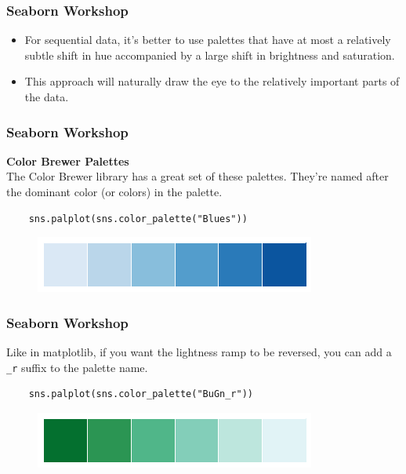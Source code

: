 \documentclass{beamer}
\begin{document}
\begin{frame}[fragile]
	\frametitle{Seaborn Workshop}
	\large
	\begin{itemize}
		\item For sequential data, it’s better to use palettes that have at most a relatively subtle shift in hue accompanied by a large shift in brightness and saturation. 
		\item This approach will naturally draw the eye to the relatively important parts of the data.
	\end{itemize}
\end{frame}
\begin{frame}[fragile]
	\frametitle{Seaborn Workshop}
	\large
	\noindent \textbf{Color Brewer Palettes}\\
	The Color Brewer library has a great set of these palettes. They’re named after the dominant color (or colors) in the palette.
	
	\begin{verbatim}
	sns.palplot(sns.color_palette("Blues"))
	\end{verbatim}
	
	\begin{figure}
		\centering
		\includegraphics[width=0.7\linewidth]{images/color_palettes_25_0}
	\end{figure}
\end{frame}
\begin{frame}[fragile]
	\frametitle{Seaborn Workshop}
	\large
	Like in matplotlib, if you want the lightness ramp to be reversed, you can add a \texttt{\_r} suffix to the palette name.
	\begin{verbatim}
	sns.palplot(sns.color_palette("BuGn_r"))
	\end{verbatim}
	
	\begin{figure}
		\centering
		\includegraphics[width=0.7\linewidth]{images/color_palettes_27_0}
	\end{figure}
	
	
\end{frame}
\end{document}
